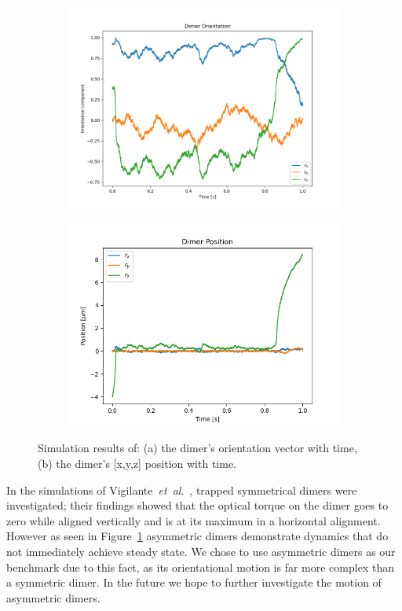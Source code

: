 \begin{figure}[h!]
	\centering
	\begin{subfigure}{0.45\textwidth}
		\subcaption{}
		\includegraphics[width =\textwidth]{fig7a.png}
	\end{subfigure}
	\begin{subfigure}{0.45\textwidth}
		\subcaption{}
		\includegraphics[width=\textwidth]{fig7b.png}
	\end{subfigure}
	\caption{Simulation results of: (a) the dimer's orientation vector with time, (b) the dimer's [x,y,z] position with time.}
	\label{fig:motion}
\end{figure}

In the simulations of Vigilante~\emph{et~al}.\ \cite{Vigilante2020Brownian_OT}, trapped symmetrical dimers were investigated; their findings showed that the optical torque on the dimer goes to zero while aligned vertically and is at its maximum in a horizontal alignment. However as seen in Figure~\ref{fig:motion} asymmetric dimers demonstrate dynamics that do not immediately achieve steady state. We chose to use asymmetric dimers as our benchmark due to this fact, as its orientational motion is far more complex than a symmetric dimer. In the future we hope to further investigate the motion of asymmetric dimers. 
